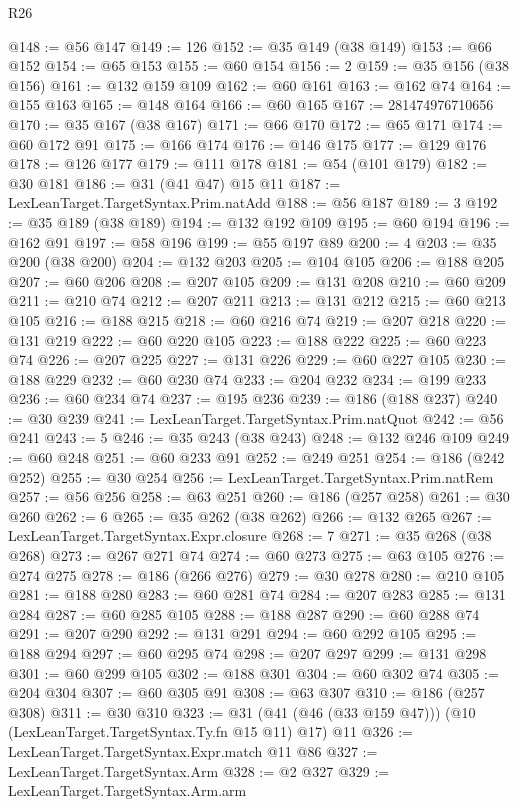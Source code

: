 \begin{lexlean}{R26}
\begin{coremodule}
@148 := @56 @147
@149 := 126
@152 := @35 @149 (@38 @149)
@153 := @66 @152
@154 := @65 @153
@155 := @60 @154
@156 := 2
@159 := @35 @156 (@38 @156)
@161 := @132 @159 @109
@162 := @60 @161
@163 := @162 @74
@164 := @155 @163
@165 := @148 @164
@166 := @60 @165
@167 := 281474976710656
@170 := @35 @167 (@38 @167)
@171 := @66 @170
@172 := @65 @171
@174 := @60 @172 @91
@175 := @166 @174
@176 := @146 @175
@177 := @129 @176
@178 := @126 @177
@179 := @111 @178
@181 := @54 (@101 @179)
@182 := @30 @181
@186 := @31 (@41 @47) @15 @11
@187 := LexLeanTarget.TargetSyntax.Prim.natAdd
@188 := @56 @187
@189 := 3
@192 := @35 @189 (@38 @189)
@194 := @132 @192 @109
@195 := @60 @194
@196 := @162 @91
@197 := @58 @196
@199 := @55 @197 @89
@200 := 4
@203 := @35 @200 (@38 @200)
@204 := @132 @203
@205 := @104 @105
@206 := @188 @205
@207 := @60 @206
@208 := @207 @105
@209 := @131 @208
@210 := @60 @209
@211 := @210 @74
@212 := @207 @211
@213 := @131 @212
@215 := @60 @213 @105
@216 := @188 @215
@218 := @60 @216 @74
@219 := @207 @218
@220 := @131 @219
@222 := @60 @220 @105
@223 := @188 @222
@225 := @60 @223 @74
@226 := @207 @225
@227 := @131 @226
@229 := @60 @227 @105
@230 := @188 @229
@232 := @60 @230 @74
@233 := @204 @232
@234 := @199 @233
@236 := @60 @234 @74
@237 := @195 @236
@239 := @186 (@188 @237)
@240 := @30 @239
@241 := LexLeanTarget.TargetSyntax.Prim.natQuot
@242 := @56 @241
@243 := 5
@246 := @35 @243 (@38 @243)
@248 := @132 @246 @109
@249 := @60 @248
@251 := @60 @233 @91
@252 := @249 @251
@254 := @186 (@242 @252)
@255 := @30 @254
@256 := LexLeanTarget.TargetSyntax.Prim.natRem
@257 := @56 @256
@258 := @63 @251
@260 := @186 (@257 @258)
@261 := @30 @260
@262 := 6
@265 := @35 @262 (@38 @262)
@266 := @132 @265
@267 := LexLeanTarget.TargetSyntax.Expr.closure
@268 := 7
@271 := @35 @268 (@38 @268)
@273 := @267 @271 @74
@274 := @60 @273
@275 := @63 @105
@276 := @274 @275
@278 := @186 (@266 @276)
@279 := @30 @278
@280 := @210 @105
@281 := @188 @280
@283 := @60 @281 @74
@284 := @207 @283
@285 := @131 @284
@287 := @60 @285 @105
@288 := @188 @287
@290 := @60 @288 @74
@291 := @207 @290
@292 := @131 @291
@294 := @60 @292 @105
@295 := @188 @294
@297 := @60 @295 @74
@298 := @207 @297
@299 := @131 @298
@301 := @60 @299 @105
@302 := @188 @301
@304 := @60 @302 @74
@305 := @204 @304
@307 := @60 @305 @91
@308 := @63 @307
@310 := @186 (@257 @308)
@311 := @30 @310
@323 := @31 (@41 (@46 (@33 @159 @47))) (@10 (LexLeanTarget.TargetSyntax.Ty.fn @15 @11) @17) @11
@326 := LexLeanTarget.TargetSyntax.Expr.match @11 @86
@327 := LexLeanTarget.TargetSyntax.Arm
@328 := @2 @327
@329 := LexLeanTarget.TargetSyntax.Arm.arm

\end{coremodule}
\end{lexlean}
